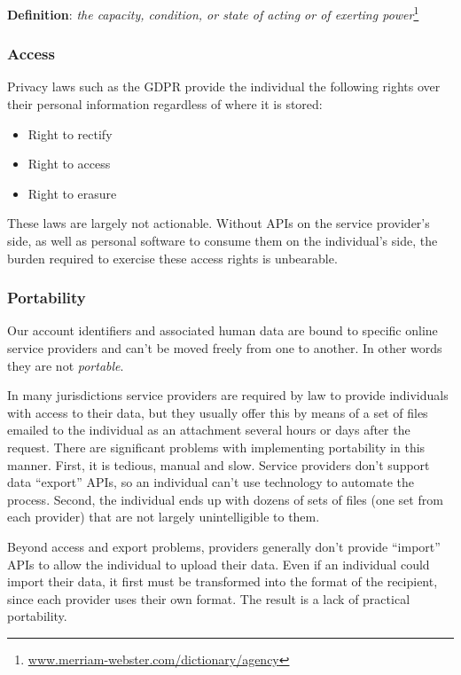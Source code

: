 \documentclass[11pt, oneside]{article}   	%
\newcommand{\hyperfootnote}[1][]{\def\ArgI{{#1}}\hyperfootnoteRelay}
\newcommand\hyperfootnoteRelay[2][]{\href{#1#2}{\ArgI}\footnote{\href{#1#2}{#2}}}
\begin{document}
\textbf{Definition}: \emph{the capacity, condition, or state of acting or of exerting power}\hyperfootnote[][https://]{www.merriam-webster.com/dictionary/agency}

\subsubsection{Access}

Privacy laws such as the GDPR provide the individual the following rights over their personal information regardless of where it is stored:
\begin{itemize}
	\item Right to rectify
	\item Right to access
	\item Right to erasure
\end{itemize}

These laws are largely not actionable. Without APIs on the service provider's side, as well as personal software to consume them on the individual's side, the burden required to exercise these access rights is unbearable.

\subsubsection{Portability}

Our account identifiers and associated human data are bound to specific online service providers and can't be moved freely from one to another. In other words they are not \emph{portable}.

In many jurisdictions service providers are required by law to provide individuals with access to their data, but they usually offer this by means of a set of files emailed to the individual as an attachment several hours or days after the request. There are significant problems with implementing portability in this manner. First, it is tedious, manual and slow. Service providers don't support data ``export'' APIs, so an individual can't use technology to automate the process. Second, the individual ends up with dozens of sets of files (one set from each provider) that are not largely unintelligible to them. 

Beyond access and export problems, providers generally don't provide ``import'' APIs to allow the individual to upload their data. Even if an individual could import their data, it first must be transformed into the format of the recipient, since each provider uses their own format. The result is a lack of practical portability.
\end{document}
